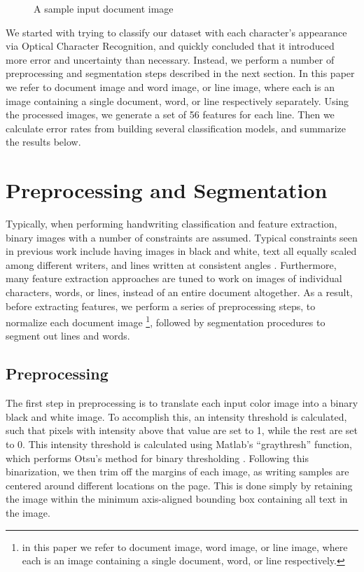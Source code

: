 \documentclass[paper=a4, fontsize=11pt]{scrartcl} %
\numberwithin{equation}{section} %
\numberwithin{figure}{section} %
\numberwithin{table}{section} %
\begin{document}
\begin{figure}
\caption{A sample input document image}
\label{fig:docImage}
\end{figure}

We started with trying to classify our dataset with each character's
appearance via Optical Character Recognition, and quickly concluded
that it introduced more error and uncertainty than necessary. Instead,
we perform a number of preprocessing and segmentation steps described
in the next section. In this paper we refer to document image and word
image, or line image, where each is an image containing a single
document, word, or line respectively separately. Using the processed
images, we generate a set of 56 features for each line. Then we
calculate error rates from building several classification models, and
summarize the results below.

\section{Preprocessing and Segmentation}
\label{sec:pands}
Typically, when performing handwriting classification and feature
extraction, binary images with a number of constraints are
assumed. Typical constraints seen in previous work include having
images in black and white, text all equally scaled among different
writers, and lines written at consistent angles
\cite{Preprocessing}. Furthermore, many feature extraction approaches
are tuned to work on images of individual characters, words, or lines,
instead of an entire document altogether. As a result, before
extracting features, we perform a series of preprocessing steps, to
normalize each document image \footnote{in this paper we refer to
document image, word image, or line image, where each is an image
containing a single document, word, or line respectively.}, followed
by segmentation procedures to segment out lines and words.

\subsection{Preprocessing}
The first step in preprocessing is to translate each input color image
into a binary black and white image. To accomplish this, an intensity
threshold is calculated, such that pixels with intensity above that
value are set to 1, while the rest are set to 0. This intensity
threshold is calculated using Matlab's ``graythresh'' function, which
performs Otsu's method for binary thresholding
\cite{ThresholdSelection}. Following this binarization, we then trim
off the margins of each image, as writing samples are centered around
different locations on the page. This is done simply by retaining the
image within the minimum axis-aligned bounding box containing all text
in the image.
\end{document}
